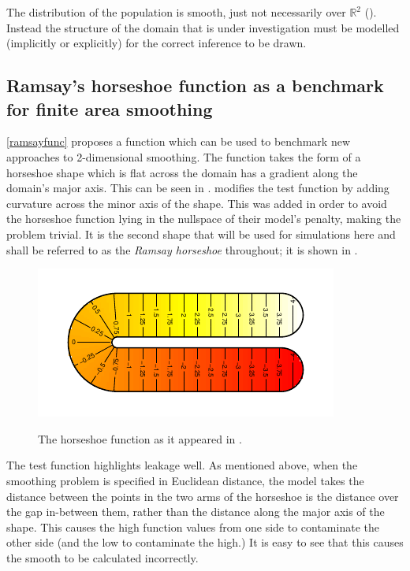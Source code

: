 The distribution of the population is smooth, just not necessarily over $\mathbb{R}^2$ (\cite{wangranalli}). Instead the structure of the domain that is under investigation must be modelled (implicitly or explicitly) for the correct inference to be drawn.

\subsection{Ramsay's horseshoe function as a benchmark for finite area smoothing}
\ref{ramsayfunc}
\cite{ramsay} proposes a function which can be used to benchmark new approaches to 2-dimensional smoothing. The function takes the form of a horseshoe shape which is flat across the domain has a gradient along the domain's major axis. This can be seen in . \cite{soap} modifies the test function by adding curvature across the minor axis of the shape. This was added in order to avoid the horseshoe function lying in the nullspace of their model's penalty, making the problem trivial. It is the second shape that will be used for simulations here and shall be referred to as the \emph{Ramsay horseshoe} throughout; it is shown in .

\begin{figure}
\centering
\includegraphics{intro/figs/orig-fs.pdf}\\
\caption{The horseshoe function as it appeared in \cite{ramsay}.}
\label{orig-fs}
\end{figure}

The test function highlights leakage well. As mentioned above, when the smoothing problem is specified in Euclidean distance, the model takes the distance between the points in the two arms of the horseshoe is the distance over the gap in-between them, rather than the distance along the major axis of the shape. This causes the high function values from one side to contaminate the other side (and the low to contaminate the high.) It is easy to see that this causes the smooth to be calculated incorrectly.
		
